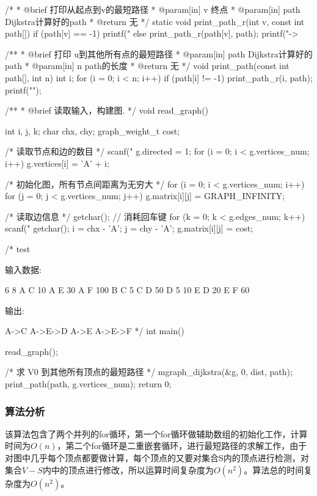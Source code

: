 \begin{Codex}[label=mgraph_dijkstra.c]
/*
 * @brief 打印从起点到v的最短路径
 * @param[in] v 终点
 * @param[in] path Dijkstra计算好的path
 * @return 无
 */
static void print_path_r(int v, const int path[]) {
    if (path[v] == -1) {
        printf("%
    } else {
        print_path_r(path[v], path);
        printf("->%
    }
}

/**
 * @brief 打印 u到其他所有点的最短路径
 * @param[in] path Dijkstra计算好的path
 * @param[in] n path的长度
 * @return 无
 */
void print_path(const int path[], int n) {
    int i;
    for (i = 0; i < n; i++) if (path[i] != -1) {
        print_path_r(i, path);
        printf("\n");
    }
}

/**
 * @brief 读取输入，构建图.
 */
void read_graph() {
    int i, j, k;
    char chx, chy;
    graph_weight_t cost;

    /* 读取节点和边的数目 */
    scanf("%
    g.directed = 1;
    for (i = 0; i < g.vertices_num; i++) g.vertices[i] = 'A' + i;

    /* 初始化图，所有节点间距离为无穷大 */
    for (i = 0; i < g.vertices_num; i++) {
        for (j = 0; j < g.vertices_num; j++) {
            g.matrix[i][j] = GRAPH_INFINITY;
        }
    }

    /* 读取边信息 */
    getchar(); // 消耗回车键
    for (k = 0; k < g.edges_num; k++) {
        scanf("%
        getchar();
        i = chx - 'A';
        j = chy - 'A';
        g.matrix[i][j] = cost;
    }
}

/* test

输入数据:

6 8
A C 10
A E 30
A F 100
B C 5
C D 50
D 5 10
E D 20
E F 60

输出:

A->C
A->E->D
A->E
A->E->F
*/
int main() {
    read_graph();

    /* 求 V0 到其他所有顶点的最短路径 */
    mgraph_dijkstra(&g, 0, dist, path);
    print_path(path, g.vertices_num);
    return 0;
}
\end{Codex}

\subsubsection{算法分析}
该算法包含了两个并列的for循环，第一个for循环做辅助数组的初始化工作，计算时间为$O(n)$，第二个for循环是二重嵌套循环，进行最短路径的求解工作，由于对图中几乎每个顶点都要做计算，每个顶点的又要对集合S内的顶点进行检测，对集合$V-S$内中的顶点进行修改，所以运算时间复杂度为$O(n^2)$。算法总的时间复杂度为$O(n^2)$。


